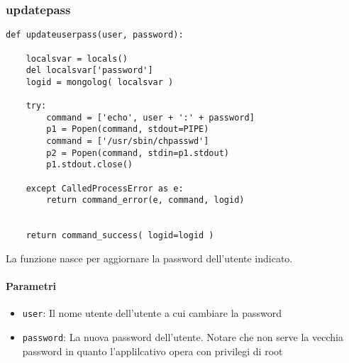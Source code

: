 \documentclass[11pt]{article}
\begin{document}
\subsubsection{updatepass}\label{updatepass}
\begin{lstlisting}
def updateuserpass(user, password):

    localsvar = locals()
    del localsvar['password']
    logid = mongolog( localsvar )
    
    try:
        command = ['echo', user + ':' + password]
        p1 = Popen(command, stdout=PIPE)
        command = ['/usr/sbin/chpasswd']
        p2 = Popen(command, stdin=p1.stdout)
        p1.stdout.close()
    
    except CalledProcessError as e:
        return command_error(e, command, logid)
    
    
    return command_success( logid=logid )
\end{lstlisting}
La funzione nasce per aggiornare la password dell'utente indicato.
\paragraph{Parametri}
\begin{itemize}
	\item{\texttt{user}: Il nome utente dell'utente a cui cambiare la password}
	\item{\texttt{password}: La nuova password dell'utente. Notare che non serve la vecchia password
		in quanto l'applilcativo opera con privilegi di root}
\end{itemize}
\end{document}
